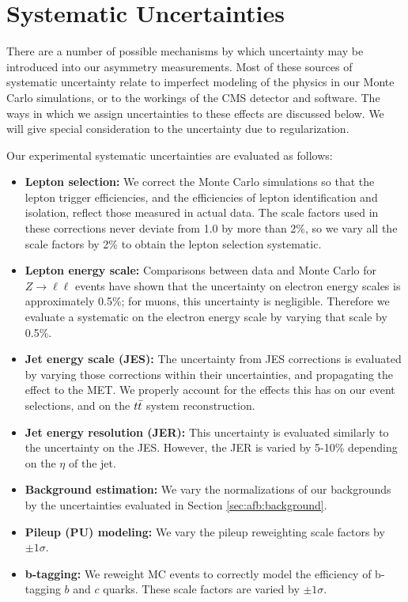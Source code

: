 
\section{Systematic Uncertainties}
\label{sec:afb:systematics}

There are a number of possible mechanisms by which uncertainty may be
introduced into our asymmetry measurements. Most of these sources of
systematic uncertainty relate to imperfect modeling of the physics in our Monte
Carlo simulations, or to the workings of the CMS detector and
software. The ways in which we assign uncertainties
to these effects are discussed below. We will give special
consideration to the uncertainty due to regularization.

Our experimental systematic uncertainties are evaluated as follows:

\begin{itemize}
\item \textbf{Lepton selection:} We correct the Monte Carlo
  simulations so that the lepton trigger efficiencies, and the
  efficiencies of lepton identification and isolation, reflect those
  measured in actual data. The scale factors used in these corrections
  never deviate from 1.0 by more than 2\%, so we vary all the scale
  factors by 2\% to obtain the lepton selection systematic.
\item \textbf{Lepton energy scale:} Comparisons between data and Monte
  Carlo for $Z \rightarrow \ell\ell$ events have shown that the
  uncertainty on electron energy scales is approximately 0.5\%; for
  muons, this uncertainty is negligible. Therefore we evaluate a
  systematic on the electron energy scale by varying that scale by
  0.5\%.
\item \textbf{Jet energy scale (JES):} The uncertainty from JES
  corrections is evaluated by varying those corrections within their
  uncertainties, and propagating the effect to the MET. We properly
  account for the effects this has on our event selections, and on the
  $t\bar{t}$ system reconstruction.
\item \textbf{Jet energy resolution (JER):} This uncertainty is
  evaluated similarly to the uncertainty on the JES. However, the JER
  is varied by 5-10\% depending on the $\eta$ of the jet.
\item \textbf{Background estimation:} We vary the normalizations of
  our backgrounds by the uncertainties evaluated in Section
  \ref{sec:afb:background}.
\item \textbf{Pileup (PU) modeling:} We vary the pileup reweighting
  scale factors by $\pm 1 \sigma$.
\item \textbf{b-tagging:} We reweight MC events to correctly model the
  efficiency of b-tagging $b$ and $c$ quarks. These scale factors are
  varied by $\pm 1 \sigma$.
\end{itemize}

